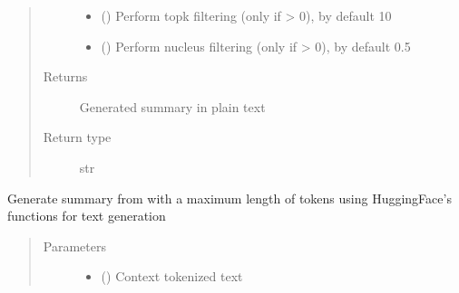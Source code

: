 \documentclass[letterpaper,10pt,english]{sphinxmanual}
\begin{document}
\begin{fulllineitems}
\begin{fulllineitems}
\begin{quote}
\begin{description}
\begin{itemize}
\item {} 
\sphinxAtStartPar
{} (\sphinxstyleliteralemphasis{\sphinxupquote{, }}) \textendash{} Perform top\sphinxhyphen{}k filtering (only if  \textgreater{} 0), by default 10

\item {} 
\sphinxAtStartPar
{} (\sphinxstyleliteralemphasis{\sphinxupquote{, }}) \textendash{} Perform nucleus filtering (only if  \textgreater{} 0), by default 0.5

\end{itemize}

\item[{Returns}] \leavevmode
\sphinxAtStartPar
Generated summary in plain text

\item[{Return type}] \leavevmode
\sphinxAtStartPar
str

\end{description}\end{quote}

\end{fulllineitems}


\begin{fulllineitems}
\label{\detokenize{code:gpt2_summarizer.GPT2Summarizer.generate_sample_huggingface}}
\sphinxAtStartPar
Generate summary from  with a maximum length of  tokens using
HuggingFace’s functions for text generation
\begin{quote}\begin{description}
\item[{Parameters}] \leavevmode\begin{itemize}
\item {} 
\sphinxAtStartPar
{} () \textendash{} Context tokenized text


\end{itemize}
\end{description}
\end{quote}
\end{fulllineitems}
\end{fulllineitems}
\end{document}
